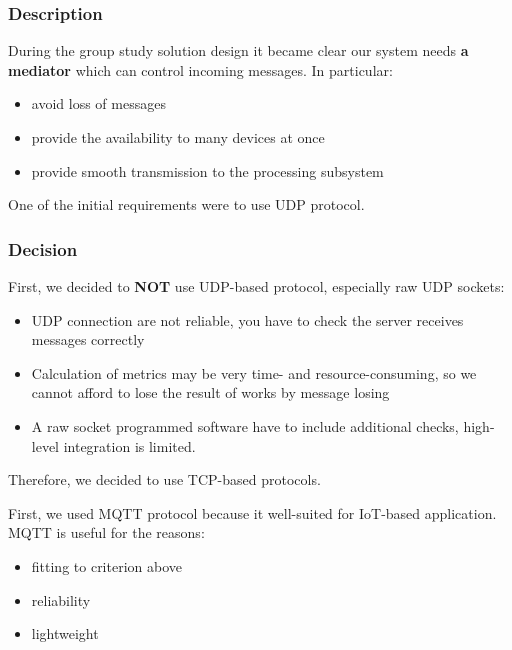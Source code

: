 \hypertarget{description-1}{%
\subsubsection{Description}\label{description-1}}

During the group study solution design it became clear our system needs
\textbf{a mediator} which can control incoming messages. In particular:

\begin{itemize}
\tightlist
\item
  avoid loss of messages
\item
  provide the availability to many devices at once
\item
  provide smooth transmission to the processing subsystem
\end{itemize}

One of the initial requirements were to use UDP protocol.

\hypertarget{decision-1}{%
\subsubsection{Decision}\label{decision-1}}

First, we decided to \textbf{NOT} use UDP-based protocol, especially raw
UDP sockets:

\begin{itemize}
\tightlist
\item
  UDP connection are not reliable, you have to check the server receives
  messages correctly
\item
  Calculation of metrics may be very time- and resource-consuming, so we
  cannot afford to lose the result of works by message losing
\item
  A raw socket programmed software have to include additional checks,
  high-level integration is limited.
\end{itemize}

Therefore, we decided to use TCP-based protocols.

First, we used MQTT protocol because it well-suited for IoT-based
application. MQTT is useful for the reasons:

\begin{itemize}
\tightlist
\item
  fitting to criterion above
\item
  reliability
\item
  lightweight
\end{itemize}

